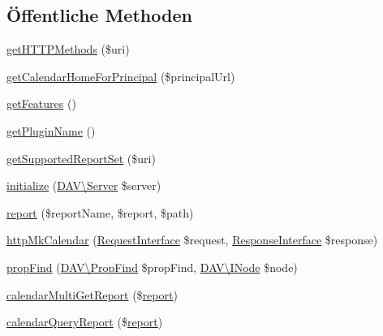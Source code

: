 \subsection*{Öffentliche Methoden}
\begin{DoxyCompactItemize}
\item 
\mbox{\hyperlink{class_sabre_1_1_cal_d_a_v_1_1_plugin_a43365a562ed35d39fc4d8d4f1d3940f2}{get\+H\+T\+T\+P\+Methods}} (\$uri)
\item 
\mbox{\hyperlink{class_sabre_1_1_cal_d_a_v_1_1_plugin_a3ad4b8e91b5747fda8ab7acdb1b4ca88}{get\+Calendar\+Home\+For\+Principal}} (\$principal\+Url)
\item 
\mbox{\hyperlink{class_sabre_1_1_cal_d_a_v_1_1_plugin_ac94b65b9bc62b3c4de01dbb7623173cd}{get\+Features}} ()
\item 
\mbox{\hyperlink{class_sabre_1_1_cal_d_a_v_1_1_plugin_abf5f5d4bbb586da79ddf124f9618dfa1}{get\+Plugin\+Name}} ()
\item 
\mbox{\hyperlink{class_sabre_1_1_cal_d_a_v_1_1_plugin_a8df46395aa749974a57b1de2e4bab0e8}{get\+Supported\+Report\+Set}} (\$uri)
\item 
\mbox{\hyperlink{class_sabre_1_1_cal_d_a_v_1_1_plugin_a56047b2fbc3397f3bd5ae732ec245151}{initialize}} (\mbox{\hyperlink{class_sabre_1_1_d_a_v_1_1_server}{D\+A\+V\textbackslash{}\+Server}} \$server)
\item 
\mbox{\hyperlink{class_sabre_1_1_cal_d_a_v_1_1_plugin_a0b4b1b8566b5cc8d024a46ecd47bc3c3}{report}} (\$report\+Name, \$report, \$path)
\item 
\mbox{\hyperlink{class_sabre_1_1_cal_d_a_v_1_1_plugin_aa3a210732c597604ad2ee249aa0f02c6}{http\+Mk\+Calendar}} (\mbox{\hyperlink{interface_sabre_1_1_h_t_t_p_1_1_request_interface}{Request\+Interface}} \$request, \mbox{\hyperlink{interface_sabre_1_1_h_t_t_p_1_1_response_interface}{Response\+Interface}} \$response)
\item 
\mbox{\hyperlink{class_sabre_1_1_cal_d_a_v_1_1_plugin_a6709e49e766f4897a2868729dcfc4e90}{prop\+Find}} (\mbox{\hyperlink{class_sabre_1_1_d_a_v_1_1_prop_find}{D\+A\+V\textbackslash{}\+Prop\+Find}} \$prop\+Find, \mbox{\hyperlink{interface_sabre_1_1_d_a_v_1_1_i_node}{D\+A\+V\textbackslash{}\+I\+Node}} \$node)
\item 
\mbox{\hyperlink{class_sabre_1_1_cal_d_a_v_1_1_plugin_a31853947785717c819543c66ccf5e975}{calendar\+Multi\+Get\+Report}} (\$\mbox{\hyperlink{class_sabre_1_1_cal_d_a_v_1_1_plugin_a0b4b1b8566b5cc8d024a46ecd47bc3c3}{report}})
\item 
\mbox{\hyperlink{class_sabre_1_1_cal_d_a_v_1_1_plugin_aea073354cd6ebd0bdd4b59fc63dcc389}{calendar\+Query\+Report}} (\$\mbox{\hyperlink{class_sabre_1_1_cal_d_a_v_1_1_plugin_a0b4b1b8566b5cc8d024a46ecd47bc3c3}{report}})

\end{DoxyCompactItemize}
